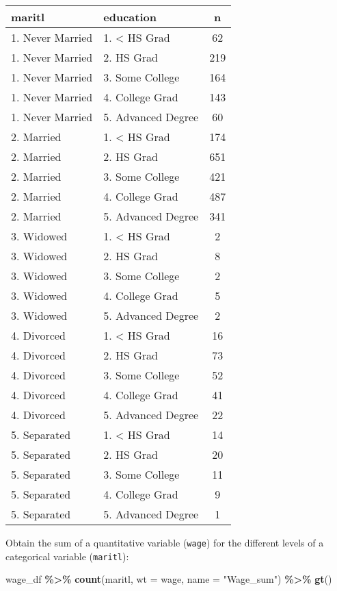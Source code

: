 \documentclass[
]{book}
\newenvironment{Shaded}{\begin{snugshade}}{\end{snugshade}}
\newcommand{\DataTypeTok}[1]{\textcolor[rgb]{0.13,0.29,0.53}{#1}}
\newcommand{\KeywordTok}[1]{\textcolor[rgb]{0.13,0.29,0.53}{\textbf{#1}}}
\newcommand{\NormalTok}[1]{#1}
\newcommand{\OperatorTok}[1]{\textcolor[rgb]{0.81,0.36,0.00}{\textbf{#1}}}
\newcommand{\StringTok}[1]{\textcolor[rgb]{0.31,0.60,0.02}{#1}}
\begin{document}
\captionsetup[table]{labelformat=empty,skip=1pt}
\begin{longtable}{llc}
\toprule
maritl & education & n \\ 
\midrule
1. Never Married & 1. < HS Grad & 62 \\ 
1. Never Married & 2. HS Grad & 219 \\ 
1. Never Married & 3. Some College & 164 \\ 
1. Never Married & 4. College Grad & 143 \\ 
1. Never Married & 5. Advanced Degree & 60 \\ 
2. Married & 1. < HS Grad & 174 \\ 
2. Married & 2. HS Grad & 651 \\ 
2. Married & 3. Some College & 421 \\ 
2. Married & 4. College Grad & 487 \\ 
2. Married & 5. Advanced Degree & 341 \\ 
3. Widowed & 1. < HS Grad & 2 \\ 
3. Widowed & 2. HS Grad & 8 \\ 
3. Widowed & 3. Some College & 2 \\ 
3. Widowed & 4. College Grad & 5 \\ 
3. Widowed & 5. Advanced Degree & 2 \\ 
4. Divorced & 1. < HS Grad & 16 \\ 
4. Divorced & 2. HS Grad & 73 \\ 
4. Divorced & 3. Some College & 52 \\ 
4. Divorced & 4. College Grad & 41 \\ 
4. Divorced & 5. Advanced Degree & 22 \\ 
5. Separated & 1. < HS Grad & 14 \\ 
5. Separated & 2. HS Grad & 20 \\ 
5. Separated & 3. Some College & 11 \\ 
5. Separated & 4. College Grad & 9 \\ 
5. Separated & 5. Advanced Degree & 1 \\ 
\bottomrule
\end{longtable}

Obtain the sum of a quantitative variable (\texttt{wage}) for the different levels of a categorical variable (\texttt{maritl}):

\begin{Shaded}
\begin{Highlighting}[]
\NormalTok{wage\_df }\OperatorTok{\%\textgreater{}\%}\StringTok{  }
\StringTok{  }\KeywordTok{count}\NormalTok{(maritl,}
        \DataTypeTok{wt =}\NormalTok{ wage,}
        \DataTypeTok{name =} \StringTok{"Wage\_sum"}\NormalTok{) }\OperatorTok{\%\textgreater{}\%}\StringTok{ }
\StringTok{  }\KeywordTok{gt}\NormalTok{()}
\end{Highlighting}
\end{Shaded}
\end{document}
